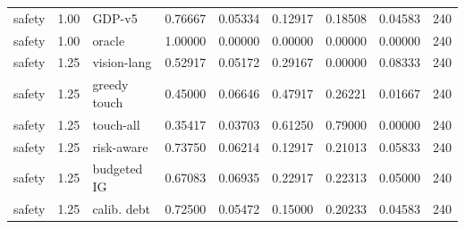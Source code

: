 \documentclass{article}
\begin{document}
\begin{center}
\begin{longtable}{lllllllll}
safety & 1.00 & GDP-v5 & 0.76667 & 0.05334 & 0.12917 & 0.18508 & 0.04583 & 240 \\
safety & 1.00 & oracle & 1.00000 & 0.00000 & 0.00000 & 0.00000 & 0.00000 & 240 \\
safety & 1.25 & vision-lang & 0.52917 & 0.05172 & 0.29167 & 0.00000 & 0.08333 & 240 \\
safety & 1.25 & greedy touch & 0.45000 & 0.06646 & 0.47917 & 0.26221 & 0.01667 & 240 \\
safety & 1.25 & touch-all & 0.35417 & 0.03703 & 0.61250 & 0.79000 & 0.00000 & 240 \\
safety & 1.25 & risk-aware & 0.73750 & 0.06214 & 0.12917 & 0.21013 & 0.05833 & 240 \\
safety & 1.25 & budgeted IG & 0.67083 & 0.06935 & 0.22917 & 0.22313 & 0.05000 & 240 \\
safety & 1.25 & calib. debt & 0.72500 & 0.05472 & 0.15000 & 0.20233 & 0.04583 & 240 \\
\bottomrule
\end{longtable}
\renewcommand{\arraystretch}{1.0}
\end{center}
\end{document}
